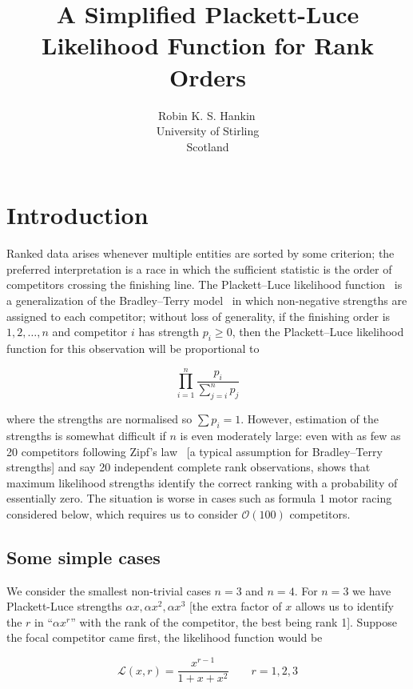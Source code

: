 \documentclass[article]{ajs}
\author{Robin K. S. Hankin\,\orcidlink{0000-0001-5982-0415}\\
  University of Stirling\\ Scotland}
\title{A Simplified Plackett-Luce Likelihood Function for Rank Orders}
\begin{document}

\section{Introduction}

Ranked data arises whenever multiple entities are sorted by some
criterion; the preferred interpretation is a race in which the
sufficient statistic is the order of competitors crossing the
finishing line.  The Plackett--Luce likelihood
function~\citep{luce1959,plackett1975} is a generalization of the
Bradley--Terry model~\citep{bradley1952} in which non-negative
strengths are assigned to each competitor; without loss of generality,
if the finishing order is $1,2,\ldots,n$ and competitor $i$ has
strength $p_i\geqslant 0$, then the Plackett--Luce likelihood function
for this observation will be proportional to

\begin{equation}\label{plackettluce}
\prod_{i=1}^n\frac{p_i}{\sum_{j=i}^np_j}
\end{equation}

\noindent where the strengths are normalised so $\sum p_i=1$.
However, estimation of the strengths is somewhat difficult if $n$ is
even moderately large: even with as few as 20 competitors following
Zipf's law~\citep{zipf1949} [a typical assumption for Bradley--Terry
  strengths] and say 20 independent complete rank observations,
\cite{hankin2017_rmd} shows that maximum likelihood strengths
identify the correct ranking with a probability of essentially zero.
The situation is worse in cases such as formula 1 motor racing
considered below, which requires us to consider ${\mathcal O}(100)$
competitors.

\subsection{Some simple cases}

We consider the smallest non-trivial cases $n=3$ and $n=4$.  For $n=3$
we have Plackett-Luce strengths $\alpha x,\alpha x^2,\alpha x^3$ [the
  extra factor of $x$ allows us to identify the $r$ in ``$\alpha x^r$''
  with the rank of the competitor, the best being rank 1].  Suppose
the focal competitor came first, the likelihood function would be

\begin{equation}
  \mathcal{L}(x,r)=\frac{x^{r-1}}{1+x+x^2}\qquad r=1,2,3
\end{equation}
\end{document}
